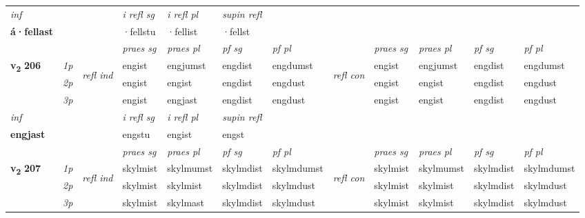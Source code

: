 \begin{longtable}[l]{X>{\footnotesize\itshape}llXXXXlXXXX}
   {\textit{inf}} & &   & \textit{i refl sg} & \textit{i refl pl}   & \textit{supin refl}  \\*
  {\textbf{á\allowbreak ·fellast}} & &   & ·fellstu & ·fellist   & ·fellst  \\*

\midrule

 & &   & \textit{praes sg}  & \textit{praes pl}    & \textit{ pf sg} & \textit{pf pl} & & \textit{praes sg}  & \textit{praes pl}    & \textit{pf sg} & \textit{pf pl }  \\ \cmidrule{4-7} \cmidrule{9-12}
 \multirow{2}{*}{{{\textbf{v{\textsubscript{2}}} \Large{\textbf{206}}}}}  & 1p & \multirow{3}{*}{\begin{turn}{90}\textit{refl ind}\end{turn}}  & engist & engjumst & engdist & engdumst & \multirow{3}{*}{\begin{turn}{90}\textit{refl con}\end{turn}}  &engist & engjumst & engdist & engdumst \\*
 & 2p &  & engist & engist & engdist & engdust & &engist & engist & engdist & engdust \\*
 & 3p  & & engist & engjast & engdist & engdust & & engist & engist& engdist & engdust \\*
\cmidrule{4-7} \cmidrule{9-12}

   {\textit{inf}} & &   & \textit{i refl sg} & \textit{i refl pl}   & \textit{supin refl}  \\*
  {\textbf{engjast}} & &   & engstu & engist   & engst  \\*

\midrule

 & &   & \textit{praes sg}  & \textit{praes pl}    & \textit{ pf sg} & \textit{pf pl} & & \textit{praes sg}  & \textit{praes pl}    & \textit{pf sg} & \textit{pf pl }  \\ \cmidrule{4-7} \cmidrule{9-12}
 \multirow{2}{*}{{{\textbf{v{\textsubscript{2}}} \Large{\textbf{207}}}}}  & 1p & \multirow{3}{*}{\begin{turn}{90}\textit{refl ind}\end{turn}}  & skylmist & skylmumst & skylmdist & skylmdumst & \multirow{3}{*}{\begin{turn}{90}\textit{refl con}\end{turn}}  &skylmist & skylmumst & skylmdist & skylmdumst \\*
 & 2p &  & skylmist & skylmist & skylmdist & skylmdust & &skylmist & skylmist & skylmdist & skylmdust \\*
 & 3p  & & skylmist & skylmast & skylmdist & skylmdust & & skylmist & skylmist& skylmdist & skylmdust \\*
\cmidrule{4-7} \cmidrule{9-12}


\end{longtable}

